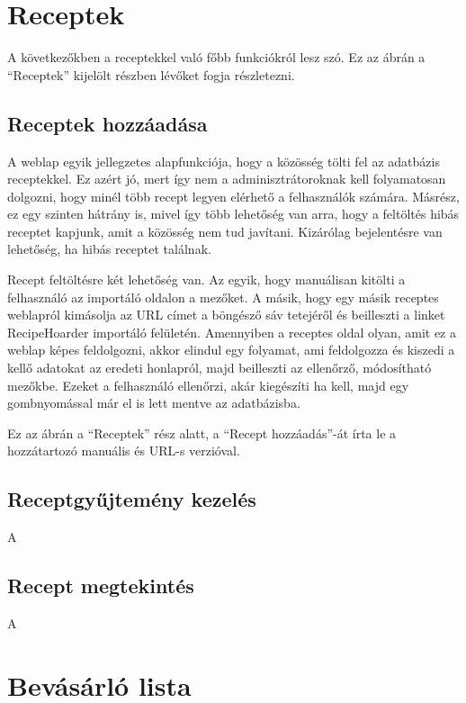 \documentclass[12pt]{report}
\theoremstyle{definition}
\begin{document}

\section{Receptek}
A következőkben a receptekkel való főbb funkciókról lesz szó. Ez az ábrán a “Receptek” kijelölt részben lévőket fogja részletezni.

\subsection{Receptek hozzáadása}
A weblap egyik jellegzetes alapfunkciója, hogy a közösség tölti fel az adatbázis receptekkel. Ez azért jó, mert így nem a adminisztrátoroknak kell folyamatosan dolgozni, hogy minél több recept legyen elérhető a felhasználók számára. Másrész, ez egy szinten hátrány is, mivel így több lehetőség van arra, hogy a feltöltés hibás receptet kapjunk, amit a közösség nem tud javítani. Kizárólag bejelentésre van lehetőség, ha hibás receptet találnak.

Recept feltöltésre két lehetőség van. Az egyik, hogy manuálisan kitölti a felhasználó az importáló oldalon a mezőket. A másik, hogy egy másik receptes weblapról kimásolja az URL címet a böngésző sáv tetejéről és beilleszti a linket RecipeHoarder importáló felületén. Amennyiben a receptes oldal olyan, amit ez a weblap képes feldolgozni, akkor elindul egy folyamat, ami feldolgozza és kiszedi a kellő adatokat az eredeti honlapról, majd beilleszti az ellenőrző, módosítható mezőkbe. Ezeket a felhasználó ellenőrzi, akár kiegészíti ha kell, majd egy gombnyomással már el is lett mentve az adatbázisba. 

Ez az ábrán a “Receptek” rész alatt, a “Recept hozzáadás”-át írta le a hozzátartozó manuális és URL-s verzióval.

\subsection{Receptgyűjtemény kezelés}
A

\subsection{Recept megtekintés}
A

\section{Bevásárló lista}
\end{document}

